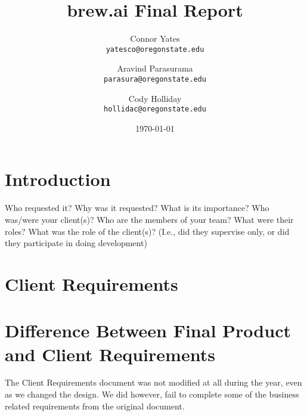\documentclass[draftclsnofoot,onecolumn,letterpaper,10pt]{IEEEtran}
\author{Connor Yates\\
\texttt{yatesco@oregonstate.edu\\}
\and
Aravind Parasurama\\
\texttt{parasura@oregonstate.edu\\}
\and
Cody Holliday\\
\texttt{hollidac@oregonstate.edu\\}}
\date{\today}
\title{brew.ai Final Report}
\begin{document}
\maketitle

\newpage
\tableofcontents
\newpage

\section{Introduction}

Who requested it?
Why was it requested?
What is its importance?
Who was/were your client(s)?
Who are the members of your team?
What were their roles?
What was the role of the client(s)? (I.e., did they supervise only, or did they participate in doing development)



\section{Client Requirements}

\section{Difference Between Final Product and Client Requirements}
The Client Requirements document was not modified at all during the year, even as we changed the design.
We did however, fail to complete some of the business related requirements from the original document.
\end{document}
